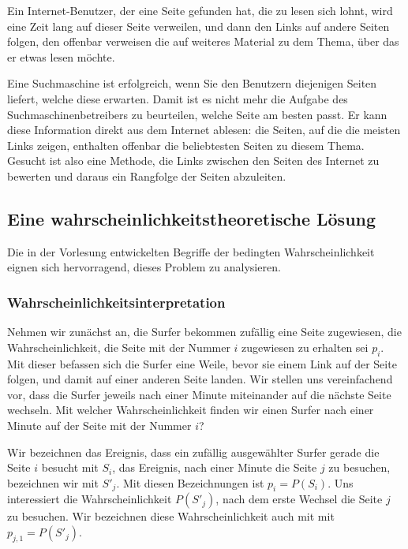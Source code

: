 Ein Internet-Benutzer, der eine Seite gefunden hat, die zu lesen sich lohnt,
wird eine Zeit lang auf dieser Seite verweilen, und dann den Links auf
andere Seiten folgen, den offenbar verweisen die auf weiteres Material zu
dem Thema, über das er etwas lesen möchte.

Eine Suchmaschine ist erfolgreich, wenn Sie den Benutzern diejenigen Seiten
liefert, welche diese erwarten.
Damit ist es nicht mehr die Aufgabe des
Suchmaschinenbetreibers zu beurteilen, welche Seite am besten passt.
Er
kann diese Information direkt aus dem Internet ablesen: die Seiten, auf die
die meisten Links zeigen, enthalten offenbar die beliebtesten Seiten zu diesem
Thema.
Gesucht ist also eine Methode, die Links zwischen den Seiten des
Internet zu bewerten und daraus ein Rangfolge der Seiten abzuleiten.

\subsection{Eine wahrscheinlichkeitstheoretische Lösung}
Die in der Vorlesung entwickelten Begriffe der bedingten Wahrscheinlichkeit
eignen sich hervorragend, dieses Problem zu analysieren.

\subsubsection{Wahrscheinlichkeitsinterpretation}
Nehmen wir zunächst an, die Surfer bekommen zufällig eine Seite zugewiesen,
die Wahrscheinlichkeit, die Seite mit der Nummer $i$ zugewiesen zu erhalten
sei $p_i$.
Mit dieser befassen sich die Surfer eine Weile, bevor sie einem Link auf
der Seite folgen, und damit auf einer anderen Seite landen.
Wir stellen
uns vereinfachend vor, dass die Surfer jeweils nach einer Minute miteinander
auf die nächste Seite wechseln.
Mit welcher Wahrscheinlichkeit finden wir
einen Surfer nach einer Minute auf der Seite mit der Nummer $i$?

Wir bezeichnen das Ereignis, dass ein zufällig ausgewählter Surfer gerade
die Seite $i$ besucht mit $S_i$, das Ereignis, nach einer Minute die Seite
$j$ zu besuchen, bezeichnen wir mit $S'_j$.
Mit diesen Bezeichnungen ist
$p_i=P(S_i)$.
Uns interessiert die Wahrscheinlichkeit $P(S'_j)$, nach dem erste
Wechsel die Seite $j$ zu besuchen.
Wir bezeichnen diese Wahrscheinlichkeit
auch mit mit $p_{j,1} = P(S'_j)$.

